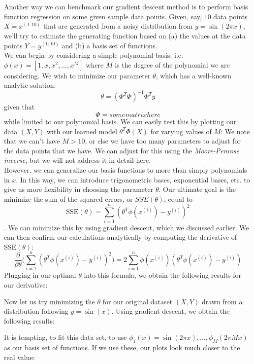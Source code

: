 \documentclass[11pt,letterpaper]{article}
\begin{document}
\section{}
Another way we can benchmark our gradient descent method is to perform basis function regression on some given sample data points. Given, say, $10$ data points $X = x^{(1:10)}$ that are generated from a noisy distribution from $y = \sin(2\pi x)$, we'll try to estimate the generating function based on (a) the values at the data points $Y = y^{(1:10)}$ and (b) a basis set of functions.\\
We can begin by considering a simple polynomial basis; i.e. $\phi(x) = [1, x, x^2, \ldots , x^M]$ where $M$ is the degree of the polynomial we are considering. We wish to minimize our parameter $\theta$, which has a well-known analytic solution:
$$\theta = (\Phi^T\Phi)^{-1}\Phi^Ty$$
given that
$$\Phi = some matrix here$$
while limited to our polynomial basis. We can easily test this by plotting our data $(X, Y)$ with our learned model $\theta^T\Phi(X)$ for varying values of $M$:
We note that we can't have $M > 10$, or else we have too many parameters to adjust for the data points that we have. We can adjust for this using the \textit{Moore-Penrose inverse}, but we will not address it in detail here.\\
However, we can generalize our basis functions to more than simply polynomials in $x$. In this way, we can introduce trigonometric bases, exponential bases, etc. to give us more flexibility in choosing the parameter $\theta$. Our ultimate goal is the minimize the sum of the squared errors, or $SSE(\theta)$, equal to
$$\text{SSE}(\theta) = \sum_{i=1}^n (\theta^T\phi(x^{(i)}) - y^{(i)})^2$$.
We can minimize this by using gradient descent, which we discussed earlier. We can then confirm our calculations analytically by computing the derivative of $\text{SSE}(\theta)$:
$$\frac{\partial}{\partial\theta}\Big(\sum_{i=1}^n (\theta^T\phi(x^{(i)}) - y^{(i)})^2\Big) = 2\sum_{i=1}^n \phi(x^{(i)})(\theta^T\phi(x^{(i)}) - y^{(i)})$$
Plugging in our optimal $\theta$ into this formula, we obtain the following results for our derivative:

Now let us try minimizing the $\theta$ for our original dataset $(X, Y)$ drawn from a distribution following $y = \sin(x)$. Using gradient descent, we obtain the following results:

It is tempting, to fit this data set, to use $\phi_1(x) = \sin(2\pi x), \ldots , \phi_M(2\pi Mx)$ as our basis set of functions. If we use these, our plots look much closer to the real value:
\end{document}
